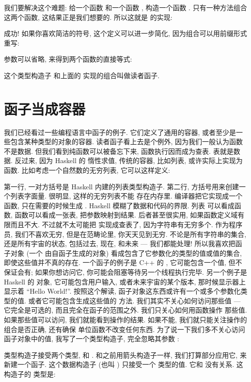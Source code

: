 我们要解决这个难题: 给一个函数  和一个函数 , 构造一个函数 .
只有一种方法组合这两个函数, 这结果正是我们想要的. 所以这就是  的实现:

成功! 如果你喜欢简洁的符号, 这个定义可以进一步简化, 因为组合可以用前缀形式重写:

参数可以省略, 来得到两个函数的直接等式:

这个类型构造子  和上面的  实现的组合叫做读者函子.

\section{函子当成容器}

我们已经看过一些编程语言中函子的例子. 它们定义了通用的容器, 或者至少是一些包含某种类型的对象的容器. 读者函子看上去是个例外,
因为我们一般认为函数不是数据. 但我们看到纯函数可以被备忘下来, 函数执行因而成为查表. 表就是数据. 反过来, 因为 Haskell 的
惰性求值, 传统的容器, 比如列表, 或许实际上实现为函数. 比如考虑一个自然数的无穷列表, 它可以这样定义:

第一行, 一对方括号是 Haskell 内建的列表类型构造子. 第二行, 方括号用来创建一个列表字面量. 很明显, 这样的无穷列表不能
存在内存里. 编译器把它实现成一个函数, 只在需要的时候生成 . Haskell 模糊了数据和代码的界限. 列表
可以看成函数, 函数可以看成一张表, 把参数映射到结果. 后者甚至很实用, 如果函数定义域有限而且不大. 不过就不太可能把
 实现成查表了, 因为字符串有无穷多个. 作为程序员, 我们不喜欢无穷, 但是在范畴论里, 你天天见到无穷.
不论是所有字符串的集合, 还是所有宇宙的状态, 包括过去, 现在, 和未来 --- 我们都能处理! 所以我喜欢把函子对象 (一个
由自函子生成的对象) 看成包含了它参数化的类型的值或值的集合, 即使这些值并不真的存在. 一个函子的例子是 C++ 的
, 它可能包含一个值, 但不保证会有; 如果你想访问它, 你可能会阻塞等待另一个线程执行完毕.
另一个例子是 Haskell 的  对象, 它可能包含用户输入, 或者未来宇宙的某个版本, 那时候显示器上显示着
 ``Hello World!''. 按照这个解读, 函子对象这东西或许有一个或多个参数化类型的值. 或者它可能包含生成这些值的
 方法. 我们其实不关心如何访问那些值 --- 它完全是可选的, 而且完全在函子的范围之外. 我们只关心如何用函数操作
 那些值. 如果那些值可以访问, 我们就能看到操作的结果. 如果不能, 我们就只能关注操作的组合是否正确, 还有确保
 单位函数不改变任何东西. 为了说一下我们多不关心访问函子对象中的值, 我写了一个类型构造子, 完全忽略其参数 :

 类型构造子接受两个类型,  和 . 和之前用箭头构造子一样, 我们打算部分应用它,
来新建一个函子. 这个数据构造子 (也叫 ) 只接受一个  类型的值. 它和  没有关系.
这构造子的  类型是:

